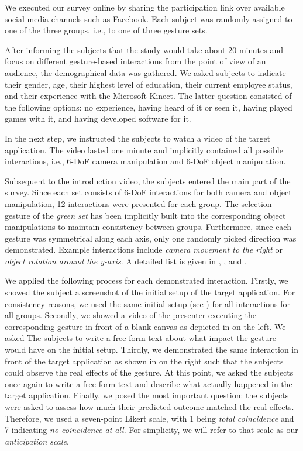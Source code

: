 \documentclass{sigchi}
\begin{document}
We executed our survey online by sharing the participation link over available social media channels such as Facebook. Each subject was randomly assigned to one of the three groups, i.e., to one of three gesture sets.

After informing the subjects that the study would take about 20 minutes and focus on different gesture-based interactions from the point of view of an audience, the demographical data was gathered. We asked subjects to indicate their gender, age, their highest level of education, their current employee status, and their experience with the Microsoft Kinect. The latter question consisted of the following options: no experience, having heard of it or seen it, having played games with it, and having developed software for it.

In the next step, we instructed the subjects to watch a video of the target application. The video lasted one minute and implicitly contained all possible interactions, i.e., 6-DoF camera manipulation and 6-DoF object manipulation.

Subsequent to the introduction video, the subjects entered the main part of the survey. Since each set consists of 6-DoF interactions for both camera and object manipulation, 12 interactions were presented for each group. The selection gesture of the \textit{green set} has been implicitly built into the corresponding object manipulations to maintain consistency between groups. Furthermore, since each gesture was symmetrical along each axis, only one randomly picked direction was demonstrated. Example interactions include \textit{camera movement to the right} or \textit{object rotation around the y-axis}. A detailed list is given in , , and .

We applied the following process for each demonstrated interaction. Firstly, we showed the subject a screenshot of the initial setup of the target application. For consistency reasons, we used the same initial setup (see ) for all interactions for all groups. Secondly, we showed a video of the presenter executing the corresponding gesture in front of a blank canvas as depicted in  on the left. We asked The subjects to write a free form text about what impact the gesture would have on the initial setup. Thirdly, we demonstrated the same interaction in front of the target application as shown in  on the right such that the subjects could observe the real effects of the gesture. At this point, we asked the subjects once again to write a free form text and describe what actually happened in the target application. Finally, we posed the most important question: the subjects were asked to assess how much their predicted outcome matched the real effects. Therefore, we used a seven-point Likert scale, with 1 being \textit{total coincidence} and 7 indicating \textit{no coincidence at all}. For simplicity, we will refer to that scale as our \textit{anticipation scale}.
\end{document}
